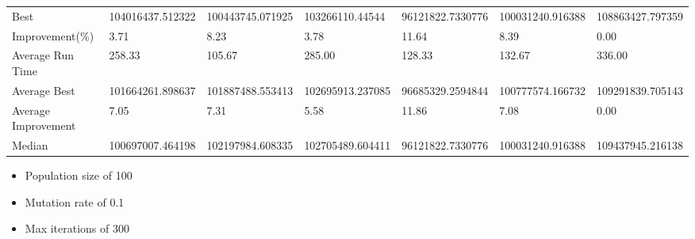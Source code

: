 \begin{table}[H]
{\begin{tabular}{lllllll}
\cellcolor[HTML]{ECF4FF}Best                & 104016437.512322 & 100443745.071925 & 103266110.44544  & 96121822.7330776 & 100031240.916388 & 108863427.797359 \\
\cellcolor[HTML]{ECF4FF}Improvement(\%)     & 3.71             & 8.23             & 3.78             & 11.64            & 8.39             & 0.00             \\
\rowcolor[HTML]{CBCEFB} 
\cellcolor[HTML]{DAE8FC}Average Run Time    & 258.33           & 105.67           & 285.00           & 128.33           & 132.67           & 336.00           \\
\rowcolor[HTML]{CBCEFB} 
\cellcolor[HTML]{DAE8FC}Average Best        & 101664261.898637 & 101887488.553413 & 102695913.237085 & 96685329.2594844 & 100777574.166732 & 109291839.705143 \\
\rowcolor[HTML]{CBCEFB} 
\cellcolor[HTML]{DAE8FC}Average Improvement & 7.05             & 7.31             & 5.58             & 11.86            & 7.08             & 0.00             \\
\rowcolor[HTML]{CBCEFB} 
\cellcolor[HTML]{DAE8FC}Median              & 100697007.464198 & 102197984.608335 & 102705489.604411 & 96121822.7330776 & 100031240.916388 & 109437945.216138
\end{tabular}%
}
\end{table}

\begin{itemize}
  \item Population size of 100
  \item Mutation rate of 0.1
  \item Max iterations of 300
\end{itemize}

